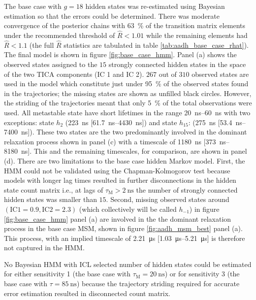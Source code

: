 The base case with $g=18$ hidden states was re-estimated using Bayesian estimation so that the errors could be determined.  There was moderate convergence of the posterior chains with \SI{63}{\percent} of the transition matrix elements under the recommended threshold of $\hat{R}<1.01$ while the remaining elements had $\hat{R}<1.1$ (the full $\hat{R}$ statistics  are tabulated in table \ref{tab:aadh_base_case_rhat}). The final model is shown in figure \ref{fig:base_case_hmm}. Panel (a) shows the observed states assigned to the $15$ strongly connected hidden states in the space of the two TICA components (IC 1 and IC 2). $267$ out of $310$ observed states are used in the model which constitute just under \SI{95}{\percent} of the observed states found in the trajectories; the missing states are shown as unfilled black circles. However, the striding of the trajectories meant that only \SI{5}{\percent} of the total observations were used. All metastable state have short lifetimes in the range \SIrange{20}{60}{\nano\second} with two exceptions: state $h_2$ (\SI{223}{\nano\second} [\SIrange[range-phrase=\text{--}]{61.7}{4430}{\nano\second}]) and state $h_{15}$: (\SI{275}{\nano\second} [\SIrange[range-phrase=\text{--}]{53.4}{7400}{\nano\second}]). These two states are the two predominantly involved in the dominant relaxation process shown in panel (c) with a timescale of \SI{1180}{\nano\second} [\SIrange[range-phrase=\text{--}]{373}{8180}{\nano\second}]. This and the remaining timescales,  for comparison,  are shown in panel (d). 
There are two limitations to the base case hidden Markov model. First, the HMM could not be validated using the Chapman-Kolmogorov test because models with longer lag times resulted in further disconnections in the hidden state count matrix i.e., at lags of $\tau_{\mathrm{M}}> \SI{2}{\nano\second}$ the number of strongly connected hidden states was smaller than $15$. Second, missing observed states around $(\mathrm{IC 1}=0.9, \mathrm{IC 2}=2.3)$ (which collectively will be called $h_{-1}$) in figure \ref{fig:base_case_hmm} panel (a) are involved in the the dominant relaxation process in the  base case MSM, shown in figure \ref{fig:aadh_msm_best} panel (a). This process, with an implied timescale of \SI{2.21}{\micro\second} [\SIrange[range-phrase=\text{--}]{1.03}{5.21}{\micro\second}] is therefore not captured in the HMM.

No Bayesian HMM with ICL selected number of hidden states could be estimated for either sensitivity 1 (the base case with $\tau_{\mathrm{M}}=\SI{20}{\nano\second}$) or for sensitivity 3 (the  base case with $\tau = \SI{85}{\nano\second}$) because the trajectory striding required for accurate error estimation resulted in disconnected count matrix.  

